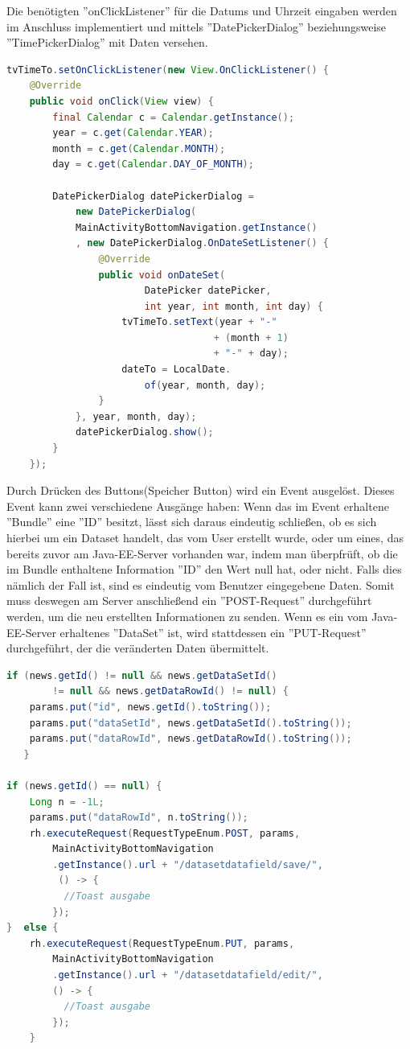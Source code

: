Die benötigten ''onClickListener'' für die Datums und Uhrzeit eingaben werden im Anschluss implementiert und mittels ''DatePickerDialog'' beziehungsweise ''TimePickerDialog'' mit Daten versehen. 
\begin{lstlisting}[language=Java,caption={OnClickListener für Datums Auswahl im NewsEditFragment}]
tvTimeTo.setOnClickListener(new View.OnClickListener() {
	@Override
    public void onClick(View view) {
    	final Calendar c = Calendar.getInstance();
        year = c.get(Calendar.YEAR);
        month = c.get(Calendar.MONTH);
        day = c.get(Calendar.DAY_OF_MONTH);

        DatePickerDialog datePickerDialog = 
        	new DatePickerDialog(
            MainActivityBottomNavigation.getInstance()
            , new DatePickerDialog.OnDateSetListener() {
            	@Override
                public void onDateSet(
                  		DatePicker datePicker,
                   		int year, int month, int day) {
                	tvTimeTo.setText(year + "-" 
                        			+ (month + 1)
                        			+ "-" + day);
                    dateTo = LocalDate.
                    	of(year, month, day);
                }
            }, year, month, day);
            datePickerDialog.show();
        }
    });
\end{lstlisting}

Durch Drücken des Buttons(Speicher Button) wird ein Event ausgelöst. Dieses Event kann zwei verschiedene Ausgänge haben: Wenn das im Event erhaltene ''Bundle'' eine ''ID'' besitzt, lässt sich daraus eindeutig schließen, ob es sich hierbei um ein Dataset handelt, das vom User erstellt wurde, oder um eines, das bereits zuvor am Java-EE-Server vorhanden war, indem man überpfrüft, ob die im Bundle enthaltene Information ''ID'' den Wert null hat, oder nicht. Falls dies nämlich der Fall ist, sind es eindeutig vom Benutzer eingegebene Daten. Somit muss deswegen am Server anschließend ein ''POST-Request'' durchgeführt werden, um die neu erstellten Informationen zu senden.
Wenn es ein vom Java-EE-Server erhaltenes ''DataSet'' ist, wird stattdessen ein ''PUT-Request'' durchgeführt, der die veränderten Daten übermittelt. 
\begin{lstlisting}[language=Java,caption={Unterscheidung der Art der Anfrage im NewsEditFragment}]
if (news.getId() != null && news.getDataSetId() 
		!= null && news.getDataRowId() != null) {
	params.put("id", news.getId().toString());
    params.put("dataSetId", news.getDataSetId().toString());
    params.put("dataRowId", news.getDataRowId().toString());
   } 
       
if (news.getId() == null) {
    Long n = -1L;
    params.put("dataRowId", n.toString());
    rh.executeRequest(RequestTypeEnum.POST, params,
       	MainActivityBottomNavigation
        .getInstance().url + "/datasetdatafield/save/",
         () -> {
          //Toast ausgabe
        });
}  else {
    rh.executeRequest(RequestTypeEnum.PUT, params,
        MainActivityBottomNavigation
        .getInstance().url + "/datasetdatafield/edit/",
       	() -> { 
          //Toast ausgabe
        });                 
    }
\end{lstlisting} 

